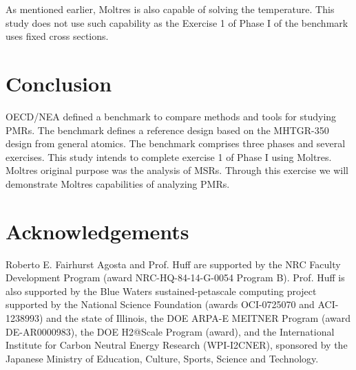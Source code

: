 \documentclass{anstrans}
\begin{document}
As mentioned earlier, Moltres is also capable of solving the temperature.
This study does not use such capability as the Exercise 1 of Phase I of the benchmark uses fixed cross sections.

\section{Conclusion}

OECD/NEA defined a benchmark to compare methods and tools for studying \glspl{PMR}.
The benchmark defines a reference design based on the MHTGR-350 design from general atomics.
The benchmark comprises three phases and several exercises.
This study intends to complete exercise 1 of Phase I using Moltres.
Moltres original purpose was the analysis of \glspl{MSR}.
Through this exercise we will demonstrate Moltres capabilities of analyzing \glspl{PMR}.

\section{Acknowledgements}

Roberto E. Fairhurst Agosta and Prof. Huff are supported by the \gls{NRC} Faculty Development Program (award NRC-HQ-84-14-G-0054 Program B).
Prof. Huff is also supported by the Blue Waters sustained-petascale computing project supported by the National Science Foundation (awards OCI-0725070 and ACI-1238993) and the state of Illinois, the DOE ARPA-E MEITNER Program (award DE-AR0000983), the DOE H2@Scale Program (award), and the International Institute for Carbon Neutral Energy Research (WPI-I2CNER), sponsored by the Japanese Ministry of Education, Culture, Sports, Science and Technology.



\end{document}
